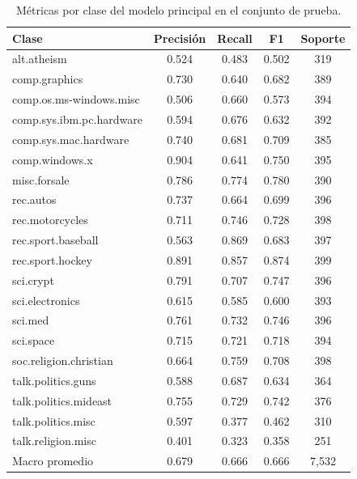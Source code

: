 \begin{table}[H]
\centering
\caption{Métricas por clase del modelo principal en el conjunto de prueba.}
\label{tab:por-clase}
\small
\begin{tabular}{lcccc}
\toprule
Clase & Precisión & Recall & F1 & Soporte \\
\midrule
alt.atheism & 0.524 & 0.483 & 0.502 & 319 \\
comp.graphics & 0.730 & 0.640 & 0.682 & 389 \\
comp.os.ms-windows.misc & 0.506 & 0.660 & 0.573 & 394 \\
comp.sys.ibm.pc.hardware & 0.594 & 0.676 & 0.632 & 392 \\
comp.sys.mac.hardware & 0.740 & 0.681 & 0.709 & 385 \\
comp.windows.x & 0.904 & 0.641 & 0.750 & 395 \\
misc.forsale & 0.786 & 0.774 & 0.780 & 390 \\
rec.autos & 0.737 & 0.664 & 0.699 & 396 \\
rec.motorcycles & 0.711 & 0.746 & 0.728 & 398 \\
rec.sport.baseball & 0.563 & 0.869 & 0.683 & 397 \\
rec.sport.hockey & 0.891 & 0.857 & 0.874 & 399 \\
sci.crypt & 0.791 & 0.707 & 0.747 & 396 \\
sci.electronics & 0.615 & 0.585 & 0.600 & 393 \\
sci.med & 0.761 & 0.732 & 0.746 & 396 \\
sci.space & 0.715 & 0.721 & 0.718 & 394 \\
soc.religion.christian & 0.664 & 0.759 & 0.708 & 398 \\
talk.politics.guns & 0.588 & 0.687 & 0.634 & 364 \\
talk.politics.mideast & 0.755 & 0.729 & 0.742 & 376 \\
talk.politics.misc & 0.597 & 0.377 & 0.462 & 310 \\
talk.religion.misc & 0.401 & 0.323 & 0.358 & 251 \\
\midrule
Macro promedio & 0.679 & 0.666 & 0.666 & 7{,}532 \\
\bottomrule
\end{tabular}
\end{table}
